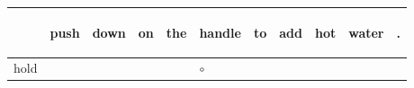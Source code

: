 \documentclass[landscape]{article}
\newcommand{\ssp}{\hspace{2pt}}
\newcommand{\map}{\cellcolor{y}$\boldsymbol\circ$}
\begin{document}
\noindent\begin{tabular}{|l|p{10pt}|p{10pt}|p{10pt}|p{10pt}|p{10pt}|p{10pt}|p{10pt}|p{10pt}|p{10pt}|p{10pt}|}
\hline
&\begin{sideways}\cellcolor{ref0}push\hspace{12pt}\end{sideways}&\begin{sideways}\cellcolor{ref1}down\hspace{12pt}\end{sideways}&\begin{sideways}\cellcolor{ref2}on\hspace{12pt}\end{sideways}&\begin{sideways}\cellcolor{ref3}the\hspace{12pt}\end{sideways}&\begin{sideways}\cellcolor{ref4}handle\hspace{12pt}\end{sideways}&\begin{sideways}\cellcolor{ref5}to\hspace{12pt}\end{sideways}&\begin{sideways}\cellcolor{ref6}add\hspace{12pt}\end{sideways}&\begin{sideways}\cellcolor{ref7}hot\hspace{12pt}\end{sideways}&\begin{sideways}\cellcolor{ref8}water\hspace{12pt}\end{sideways}&\begin{sideways}\cellcolor{ref9}.\hspace{12pt}\end{sideways}\\
\hline
\ssp \cellcolor{ref4}hold \ssp&\hspace{2pt}&\hspace{2pt}&\hspace{2pt}&\hspace{2pt}&\hspace{2pt}\map&\hspace{2pt}&\hspace{2pt}&\hspace{2pt}&\hspace{2pt}&\hspace{2pt}\\

\end{tabular}
\end{document}
